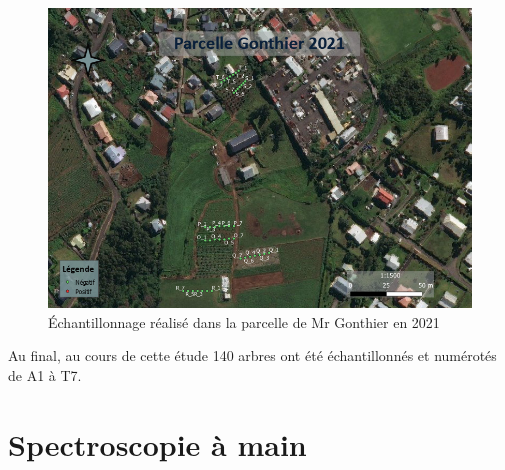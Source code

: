 \documentclass[
  11pt,
  french,
  a4paper,
  extrafontsizes,onecolumn,openright
  ]{memoir}
\begin{document}
\scriptsize

\begin{figure}

{\centering \includegraphics[width=0.8\linewidth]{Images/Figure6} 

}

\caption{Échantillonnage réalisé dans la parcelle de Mr Gonthier en 2021}\label{fig:6}
\end{figure}

\normalsize

Au final, au cours de cette étude 140 arbres ont été échantillonnés et numérotés de A1 à T7.

\vfill
\newpage

\hypertarget{spectroscopie-uxe0-main}{%
\section{Spectroscopie à main}\label{spectroscopie-uxe0-main}}
\end{document}
